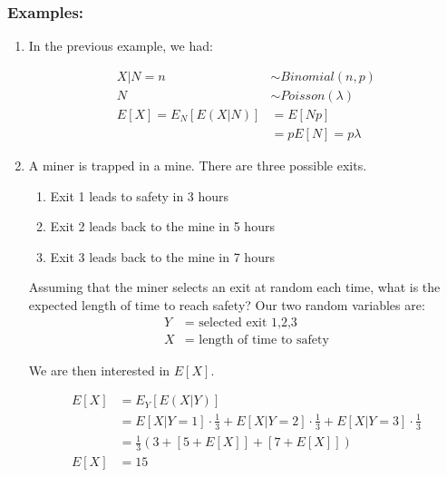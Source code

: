 \documentclass{article}
\begin{document}
\subsubsection*{Examples:}
\begin{enumerate}
    \item In the previous example, we had:
    
    \begin{equation*}
        \begin{split}
            X|N = n &\sim Binomial(n,p)\\
            N &\sim Poisson(\lambda)\\
            E[X] = E_N[E(X|N)] &= E[Np]\\
            &= p E[N] = p\lambda
        \end{split}
    \end{equation*}
    
    \item A miner is trapped in a mine. There are three possible exits. 
    \begin{enumerate}
        \item Exit 1 leads to safety in 3 hours
        \item Exit 2 leads back to the mine in 5 hours
        \item Exit 3 leads back to the mine in 7 hours
    \end{enumerate}
    
    Assuming that the miner selects an exit at random each time, what is the expected length of time to reach safety? Our two random variables are:
    \begin{equation*}
        \begin{split}
            Y &= \text{ selected exit 1,2,3}\\
            X &= \text{ length of time to safety}
        \end{split}
    \end{equation*}
    
    We are then interested in $E[X]$.
    
    \begin{equation*}
        \begin{split}
            E[X] &= E_Y[E(X|Y)]\\
                &= E[X|Y=1]\cdot\frac{1}{3} + E[X|Y=2] \cdot \frac{1}{3} + E[X|Y=3] \cdot \frac{1}{3}\\
                &= \frac{1}{3}\left( 3 + [5 + E[X]] + [7 + E[X]] \right)\\
                E[X] &= 15
        \end{split}
    \end{equation*}
\end{enumerate}
\end{document}
